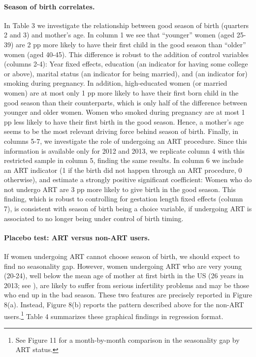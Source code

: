 \documentclass[a4paper, 12 pt]{article}
\theoremstyle{plain}
\begin{document}
\begin{doublespace}
\paragraph{Season of birth correlates.} In Table 3 we investigate the relationship between good season of birth (quarters 2 and 3) and mother's age. In column 1 we see that ``younger'' women (aged 25-39) are 2 pp more likely to have their first child in the good season than ``older'' women (aged 40-45). This difference is robust to the addition of control variables (columns 2-4): Year fixed effects, education (an indicator for having some college or above), marital status (an indicator for being married), and (an indicator for) smoking during pregnancy. In addition, high-educated women (or married women) are at most only 1 pp more likely to have their first born child in the good season than their counterparts, which is only half of the difference between younger and older women. Women who smoked during pregnancy are at most 1 pp less likely to have their first birth in the good season. Hence, a mother's age seems to be the most relevant driving force behind season of birth. Finally, in columns 5-7, we investigate the role of undergoing an ART procedure. Since this information is available only for 2012 and 2013, we replicate column 4 with this restricted sample in column 5, finding the same results. In column 6 we include an ART indicator (1 if the birth did not happen through an ART procedure, 0 otherwise), and estimate a strongly positive significant coefficient: Women who do not undergo ART are 3 pp more likely to give birth in the good season. This finding, which is robust to controlling for gestation length fixed effects (column 7), is consistent with season of birth being a choice variable, if undergoing ART is associated to no longer being under control of birth timing.%


\paragraph{Placebo test: ART versus non-ART users.} If women undergoing ART cannot choose season of birth, we should expect to find no seasonality gap. However, women undergoing ART who are very young (20-24), well below the
 mean age of mother at first birth in the US (26 years in 2013; see \citealp{Martinetal2015}), are likely to suffer from serious infertility problems and may be those who end up in the bad season. These two features are precisely reported in Figure 8(a). Instead, Figure 8(b) reports the pattern described above for the non-ART users.\footnote{See Figure 11 for a month-by-month comparison in the seasonality gap by ART status.} Table 4 summarizes these graphical findings in regression format.


\end{doublespace}
\end{document}
